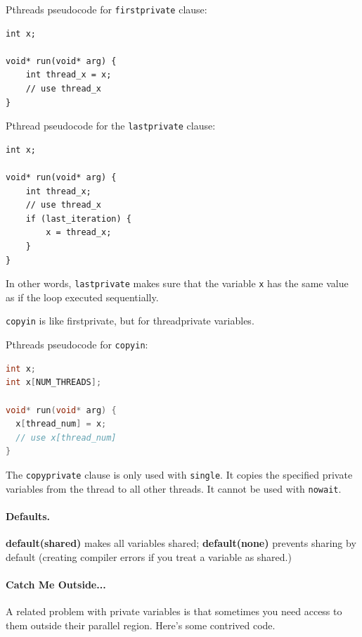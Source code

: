 \documentclass[a4paper]{report}
\begin{document}
Pthreads pseudocode for {\tt firstprivate} clause:
  \begin{lstlisting}
int x;

void* run(void* arg) {
    int thread_x = x;
    // use thread_x
}
  \end{lstlisting}

Pthread pseudocode for the {\tt lastprivate} clause:
  \begin{lstlisting}
int x;

void* run(void* arg) {
    int thread_x;
    // use thread_x
    if (last_iteration) {
        x = thread_x;
    }
}
  \end{lstlisting}
In other words, {\tt lastprivate} makes sure that the variable {\tt x}
has the same value as if the loop executed sequentially.

{\tt copyin} is like firstprivate, but for threadprivate variables.

Pthreads pseudocode for {\tt copyin}:
  \begin{lstlisting}[language=C]
int x;
int x[NUM_THREADS];

void* run(void* arg) {
  x[thread_num] = x;
  // use x[thread_num]
}
  \end{lstlisting}

The {\tt copyprivate} clause is only used with {\tt single}.
It copies the specified private variables from the thread to all other
threads. It cannot be used with {\tt nowait}.

\paragraph{Defaults.} {\bf default(shared)} makes all variables shared; 
{\bf default(none)} prevents sharing by default (creating compiler errors if
you treat a variable as shared.)



\paragraph{Catch Me Outside...}
A related problem with private variables is that sometimes you need 
access to them outside their parallel region. Here's some contrived code.
\end{document}
